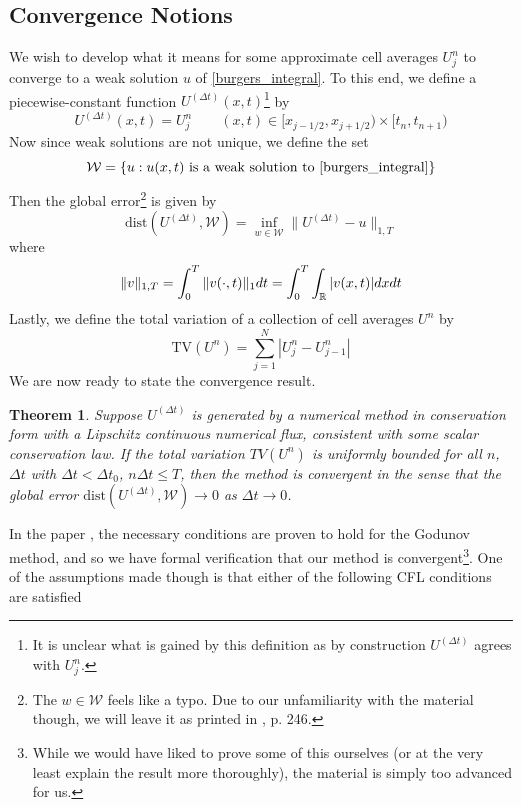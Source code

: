 \documentclass{myproject}
\newtheorem{theorem}{Theorem}
\begin{document}
\subsection{Convergence Notions}

We wish to develop what it means for some approximate cell averages $U_j^n$ to converge to a weak solution $u$ of \eqref{burgers_integral}. To this end, we define a piecewise-constant function $U^{(\Delta t)}(x,t)$\footnote{It is unclear what is gained by this definition as by construction $U^{(\Delta t)}$ agrees with $U_j^n$.} by
\begin{equation}
    U^{(\Delta t)}(x,t) = U_j^n \qquad (x,t) \in [x_{j-1/2}, x_{j+1/2}) \times [t_n, t_{n+1})
\end{equation}
Now since weak solutions are not unique, we define the set
\begin{equation}
    \mathcal{W} = \{u : u(x,t) \text{ is a weak solution to \eqref{burgers_integral}}\}
\end{equation}
Then the global error\footnote{The $w \in \mathcal{W}$ feels like a typo. Due to our unfamiliarity with the material though, we will leave it as printed in \cite{leveque2002}, p. 246.} is given by
\begin{equation}
    \text{dist}\left(U^{(\Delta t)}, \mathcal{W}\right) = \inf_{w \in \mathcal{W}} \| U^{(\Delta t)} - u \|_{1,T}
\end{equation}
where 
\begin{equation}
    \|v\|_{1,T} = \int_{0}^{T} \|v(\cdot,t)\|_1dt = \int_{0}^{T}\int_{\operatorname{\mathbb{R}}}|v(x,t)|dx dt
\end{equation}
Lastly, we define the total variation of a collection of cell averages $U^n$ by 
\begin{equation}
    \text{TV}(U^n) = \sum_{j=1}^N |U_j^n - U_{j-1}^n|
\end{equation}
We are now ready to state the convergence result.
\begin{theorem}
    Suppose $U^{(\Delta t)}$ is generated by a numerical method in conservation form with a Lipschitz continuous numerical flux, consistent with some scalar conservation law. If the total variation $TV(U^n)$ is uniformly bounded for all $n$, $\Delta t$ with $\Delta t < \Delta t_0$, $n \Delta t \leq T$, then the method is convergent in the sense that the global error $\text{dist}\left(U^{(\Delta t)}, \mathcal{W}\right) \to 0$ as $\Delta t \to 0$.
\end{theorem}
In the paper \cite{leveque1985}, the necessary conditions are proven to hold for the Godunov method, and so we have formal verification that our method is convergent\footnote{While we would have liked to prove some of this ourselves (or at the very least explain the result more thoroughly), the material is simply too advanced for us.}. One of the assumptions made though is that either of the following CFL conditions are satisfied
\end{document}
